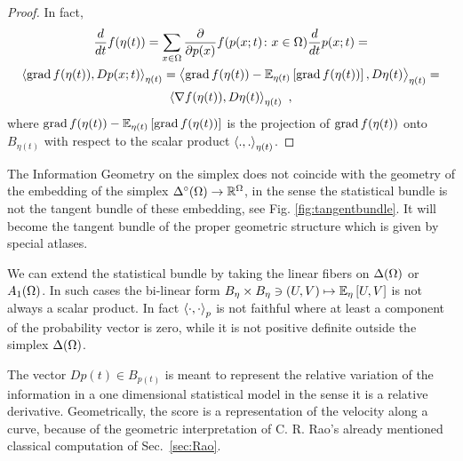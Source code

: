 \documentclass[12pt,a4paper]{amsart}
\begin{document}
\begin{proof}
In fact,
%
  \begin{multline*}
    \derivby t f(\eta(t)) = \sum_{x\in\Omega} \partiald {p(x)} f(p(x;t) \colon x\in \Omega) \derivby t p(x;t) = \\ \scalarat {\eta(t)} {\grad f(\eta(t))} {Dp(x;t)} = \scalarat {\eta(t)} {\grad f(\eta(t)) - \expectat {\eta(t)} {\grad f(\eta(t))}} {D\eta(t)} = \\  \scalarat {\eta(t)} {\nabla f(\eta(t))} {D\eta(t)} \ ,  
  \end{multline*}
%
where $\grad f(\eta(t)) - \expectat {\eta(t)} {\grad f(\eta(t))}$ is the projection of $\grad f(\eta(t))$ onto $B_{\eta(t)}$ with respect to the scalar product $\scalarat {\eta(t)}{.}{.}$.
\end{proof}

\begin{remark} The Information Geometry on the simplex does not coincide with the geometry of the embedding of the simplex $\oSimO \to \reals^\Omega$, in the sense the statistical bundle is not the tangent bundle of these embedding, see Fig. \ref{fig:tangentbundle}. It will become the tangent bundle of the proper geometric structure which is given by special atlases.
\end{remark}
\begin{remark} We can extend the statistical bundle by taking the linear fibers on $\SimO$ or $\AffineO$. In such cases the bi-linear form $B_\eta \times B_\eta \ni (U,V) \mapsto \expectat \eta {U,V}$ is not always a scalar product. In fact $\scalarat {p} \cdot \cdot$ is not faithful where at least a component of the probability vector is zero, while it is not positive definite outside the simplex $\SimO$.
\end{remark}

\begin{remark}
The vector $D p(t) \in B_{p(t)}$ is meant to represent the relative variation of the information in a one dimensional statistical model in the sense it is a relative derivative. Geometrically, the score is a representation of the velocity along a curve, because of the geometric interpretation of C. R. Rao's already mentioned classical computation of Sec.~\ref{sec:Rao}.
\end{remark}
\end{document}
